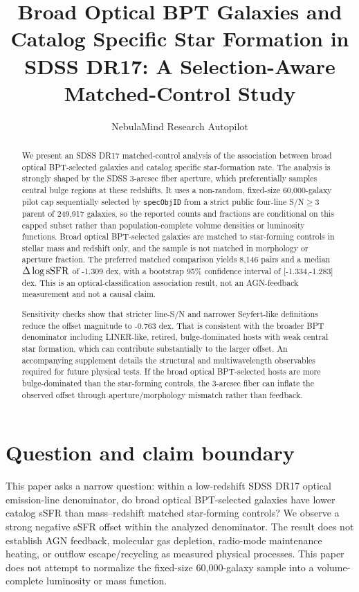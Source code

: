 \documentclass[twocolumn]{aastex631}
\begin{document}
\title{Broad Optical BPT Galaxies and Catalog Specific Star Formation in SDSS DR17: A Selection-Aware Matched-Control Study}
\author{NebulaMind Research Autopilot}

\begin{abstract}
We present an SDSS DR17 matched-control analysis of the association between broad optical BPT-selected galaxies and catalog specific star-formation rate. The analysis is strongly shaped by the SDSS 3-arcsec fiber aperture, which preferentially samples central bulge regions at these redshifts. It uses a non-random, fixed-size 60,000-galaxy pilot cap sequentially selected by \texttt{specObjID} from a strict public four-line S/N$\geq3$ parent of 249,917 galaxies, so the reported counts and fractions are conditional on this capped subset rather than population-complete volume densities or luminosity functions. Broad optical BPT-selected galaxies are matched to star-forming controls in stellar mass and redshift only, and the sample is not matched in morphology or aperture fraction. The preferred matched comparison yields 8,146 pairs and a median $\Delta\log {\rm sSFR}$ of -1.309 dex, with a bootstrap 95\% confidence interval of [-1.334,-1.283] dex. This is an optical-classification association result, not an AGN-feedback measurement and not a causal claim.

Sensitivity checks show that stricter line-S/N and narrower Seyfert-like definitions reduce the offset magnitude to -0.763 dex. That is consistent with the broader BPT denominator including LINER-like, retired, bulge-dominated hosts with weak central star formation, which can contribute substantially to the larger offset. An accompanying supplement details the structural and multiwavelength observables required for future physical tests. If the broad optical BPT-selected hosts are more bulge-dominated than the star-forming controls, the 3-arcsec fiber can inflate the observed offset through aperture/morphology mismatch rather than feedback.
\end{abstract}


\section{Question and claim boundary}
This paper asks a narrow question: within a low-redshift SDSS DR17 optical emission-line denominator, do broad optical BPT-selected galaxies have lower catalog sSFR than mass--redshift matched star-forming controls? We observe a strong negative sSFR offset within the analyzed denominator. The result does not establish AGN feedback, molecular gas depletion, radio-mode maintenance heating, or outflow escape/recycling as measured physical processes.
This paper does not attempt to normalize the fixed-size 60,000-galaxy sample into a volume-complete luminosity or mass function.
\end{document}
